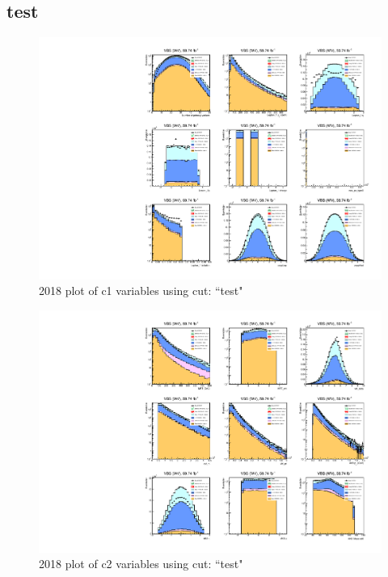 \documentclass{article}
\begin{document}
      \subsection*{test}
                        \begin{figure}[H]
                            \centering
                            \caption{2018 plot of c1 variables using cut: ``test"}
                            \includegraphics[width=\textwidth]{2018/c1_2018_test.pdf}
                        \end{figure}    
                        \begin{figure}[H]
                            \centering
                            \caption{2018 plot of c2 variables using cut: ``test"}
                            \includegraphics[width=\textwidth]{2018/c2_2018_test.pdf}
                        \end{figure}    
\end{document}
